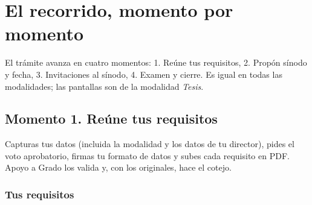 \section{El recorrido, momento por momento}
El trámite avanza en cuatro momentos: 1. Reúne tus requisitos, 2. Propón sínodo y fecha, 3. Invitaciones al sínodo, 4. Examen y cierre. Es igual en todas las modalidades; las pantallas son de la modalidad \emph{Tesis}.
\subsection{Momento 1. Reúne tus requisitos}
Capturas tus datos (incluida la modalidad y los datos de tu director), pides el voto aprobatorio, firmas tu formato de datos y subes cada requisito en PDF. Apoyo a Grado los valida y, con los originales, hace el cotejo.
\subsubsection*{Tus requisitos}
